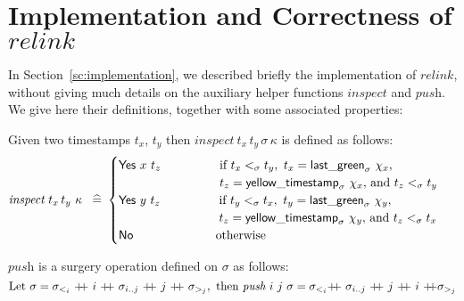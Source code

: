 \documentclass[a4paper,UKenglish]{lipics-v2016}
\newcommand{\aux}[1]{\textit{#1}}
\newcommand{\eqdef}{\mathrel{\:\widehat{=}\:}}
\def\ordlist{\sigma}
\newcommand{\C}{\kappa}
\newcommand{\tle}{\mathrel{<_\ordlist}}
\theoremstyle{definition}
\begin{document}

%

\section{Implementation and Correctness of $\aux{relink}$}
\label{sc:relink-lemmas}
\def\cat{{\mathbin{+\!\!+}}}

In Section~\ref{sc:implementation}, we described briefly the
implementation of $\aux{relink}$, without giving much details on the
auxiliary helper functions $\aux{inspect}$ and $\aux{push}$. We give
here their definitions, together with some associated properties:

\begin{definition}[inspect]\label{def:inspect}%
Given two timestamps $t_x$, $t_y$ then $\aux{inspect}\ t_x\, t_y\,
\ordlist\, \C$ is defined as follows:
\begin{equation*}
\aux{inspect}\ t_x\, t_y\ \C\ \eqdef
\begin{cases}
  \mathsf{Yes}\ x\ t_z\ \qquad \qquad
      \begin{array}[t]{l}
      \textrm{if}\ t_x \tle t_y,\ t_x = \mathsf{last\_green}_\ordlist\ \histx, \\
       t_z = \mathsf{yellow\_timestamp}_\ordlist\ \histx,\,
       \textrm{and} \ t_z \tle t_y
      \end{array} \\[5pt]
  \mathsf{Yes}\ y\ t_z\ \qquad \qquad
      \begin{array}[t]{l}
      \textrm{if}\ t_y \tle t_x,\ t_y = \mathsf{last\_green}_\ordlist\ \histy, \\
       t_z = \mathsf{yellow\_timestamp}_\ordlist\ \histy,\,
       \textrm{and} \ t_z \tle t_x
      \end{array} \\[5pt]
  \mathsf{No}\hphantom{\mathsf{s}\ x\ t_z}\ \qquad \qquad \textrm{otherwise}
\end{cases}
\end{equation*}
\end{definition}

\begin{definition}[push]\label{def:push}%
 $\aux{push}$ is a surgery operation defined on $\ordlist$ as
  follows:
\[\hfill
  \textrm{Let}\ \ordlist = \ordlist_{<_i}\ \cat
  \ i\ \cat\ \ordlist_{i..j}\ \cat\ j\ \cat\ \ordlist_{>_j},\
  \textrm{then}\
  \aux{push}\ i\ j\ \ordlist =
  \ordlist_{<_i} \cat\  \ordlist_{i..j}\ \cat\ j\ \cat\ i\ \cat \ordlist_{>_j}
  \hfill
\]
\end{definition}
\end{document}
